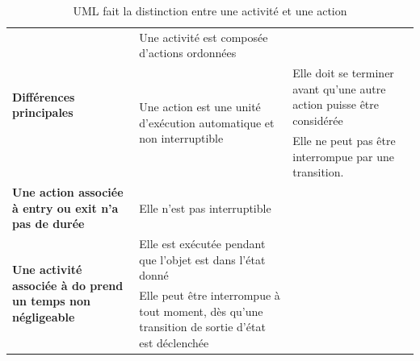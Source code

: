\begin{table}[H]
\caption{UML fait la distinction entre une activité et une action}
\label{tbl:actionactivite}
\begin{adjustbox}{max width=\textwidth}
\begin{tabular}{l|l|l}
\toprule
\multirow{3}{*}{\textbf{Différences principales}} & Une activité est composée d'actions ordonnées &\\
\cmidrule(lr){2-3}
& \multirow{2}{*}{Une action est une unité d'exécution automatique et non interruptible} & Elle doit se terminer avant qu'une autre action puisse être considérée\\
\cmidrule(lr){3-3}
& & Elle ne peut pas être interrompue par une transition. \\
\cmidrule(lr){1-3}
\textbf{Une action associée à entry ou exit n'a pas de durée} & Elle n'est pas interruptible &\\
\cmidrule(lr){1-3}
\multirow{2}{*}{\textbf{Une activité associée à do prend un temps non négligeable}} & Elle est exécutée pendant que l’objet est dans l’état
donné &\\
\cmidrule(lr){2-3}
& Elle peut être interrompue à tout moment, dès qu’une
transition de sortie d’état est déclenchée &\\
\bottomrule
\end{tabular}
\end{adjustbox}
\end{table}
